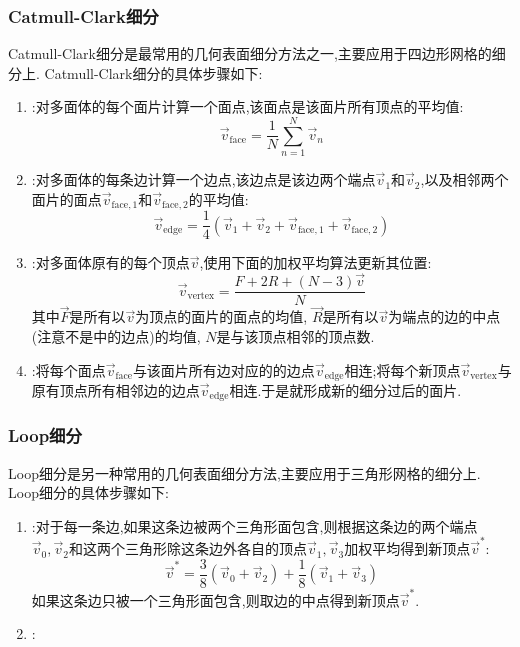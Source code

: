 \documentclass{ctexart}
\begin{document}
\subsubsection{Catmull-Clark细分}
Catmull-Clark细分是最常用的几何表面细分方法之一,主要应用于四边形网格的细分上. Catmull-Clark细分的具体步骤如下:
\begin{enumerate}[label=\tbf{\arabic*}.,topsep=0pt,parsep=0pt,itemsep=0pt,partopsep=0pt]
    \item {}:对多面体的每个面片计算一个面点,该面点是该面片所有顶点的平均值:
        \[\vec{v}_{\text{face}}=\dfrac{1}{N}\sum_{n=1}^{N}\vec{v}_n\]
    \item {}:对多面体的每条边计算一个边点,该边点是该边两个端点$\vec{v}_1$和$\vec{v}_2$,以及相邻两个面片的面点$\vec{v}_{\text{face},1}$和$\vec{v}_{\text{face},2}$的平均值:
        \[\vec{v}_{\text{edge}}=\dfrac{1}{4}\left(\vec{v}_1+\vec{v}_2+\vec{v}_{\text{face},1}+\vec{v}_{\text{face},2}\right)\]
    \item {}:对多面体原有的每个顶点$\vec{v}$,使用下面的加权平均算法更新其位置:
        \[\vec{v}_{\text{vertex}}=\dfrac{F+2R+(N-3)\vec{v}}{N}\]
        其中$\vec{F}$是所有以$\vec{v}$为顶点的面片的面点的均值, $\vec{R}$是所有以$\vec{v}$为端点的边的中点(注意不是中的边点)的均值, $N$是与该顶点相邻的顶点数.
    \item {}:将每个面点$\vec{v}_{\text{face}}$与该面片所有边对应的的边点$\vec{v}_{\text{edge}}$相连;将每个新顶点$\vec{v}_{\text{vertex}}$与原有顶点所有相邻边的边点$\vec{v}_{\text{edge}}$相连.于是就形成新的细分过后的面片.
\end{enumerate}
\subsubsection{Loop细分}
Loop细分是另一种常用的几何表面细分方法,主要应用于三角形网格的细分上. Loop细分的具体步骤如下:
\begin{enumerate}[label=\tbf{\arabic*}.,topsep=0pt,parsep=0pt,itemsep=0pt,partopsep=0pt]
    \item {}:对于每一条边,如果这条边被两个三角形面包含,则根据这条边的两个端点$\vec{v}_0,\vec{v}_2$和这两个三角形除这条边外各自的顶点$\vec{v}_1,\vec{v}_3$加权平均得到新顶点$\vec{v}^\ast$:
        \[\vec{v}^\ast=\dfrac{3}{8}\left(\vec{v}_0+\vec{v}_2\right)+\dfrac{1}{8}\left(\vec{v}_1+\vec{v}_3\right)\]
    如果这条边只被一个三角形面包含,则取边的中点得到新顶点$\vec{v}^\ast$.
    \item {}:
\end{enumerate}
\end{document}
